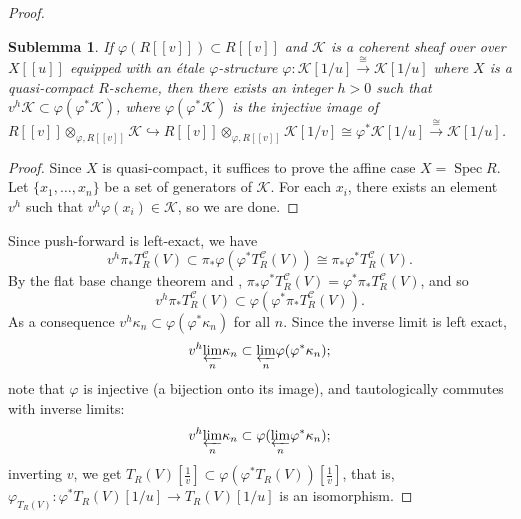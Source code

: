 \documentclass[11pt]{amsart}
\newtheorem{sublem}{Sublemma}
\numberwithin{thm}{section}
\numberwithin{lem}{section}
\numberwithin{cor}{section}
\numberwithin{prop}{section}
\numberwithin{exam}{section}
\numberwithin{dfn}{section}
\newcommand{\spec}{\operatorname{Spec}}
\newcommand{\invlim}[1]{{\varprojlim_{#1}}}
\newcommand{\cK}{\mathcal{K}}
\newcommand{\cC}{\mathcal{C}}
\begin{document}
\begin{proof}
\begin{sublem}
If $\varphi(R[\![v]\!])\subset R[\![v]\!]$
and $\cK$ is a coherent sheaf over
over $X[\![u]\!]$
equipped
with an \'etale $\varphi$-structure
$\varphi:\cK[1/u] \xrightarrow{\cong} \cK[1/u]$
where $X$ is a quasi-compact $R$-scheme,
then there exists an integer $h>0$
such that $v^h\cK \subset \varphi(\varphi^*\cK)$,
where $\varphi(\varphi^*\cK)$ is the injective image of
$R[\![v]\!]\otimes_{\varphi,R[\![v]\!]}\cK
\hookrightarrow
R[\![v]\!]\otimes_{\varphi,R[\![v]\!]}\cK[1/v]
\cong \varphi^*\cK[1/u] \xrightarrow{\cong} \cK[1/u]$.
\end{sublem}

\begin{proof}
Since $X$ is quasi-compact, it suffices to prove the
affine case $X=\spec R$.
Let $\{x_1,\dots, x_n\}$ be a set of generators of $\cK$.
For each $x_i$, there exists an element $v^h$ such that
$v^h\varphi(x_i)\in \cK$, so we are done.
\end{proof}

Since push-forward is left-exact, we have
\[
v^h \pi_*T^\cC_R(V) \subset \pi_*\varphi(\varphi^*T^\cC_R(V))
\cong \pi_*\varphi^*T^\cC_R(V).
\]
By the flat base change theorem and \cite[Lemma 5.2.5]{EG21},
$\pi_*\varphi^*T^\cC_R(V)=\varphi^*\pi_*T^\cC_R(V)$,
and so
\[
v^h \pi_*T^\cC_R(V) \subset \varphi(\varphi^*\pi_*T^\cC_R(V)).
\]
As a consequence $v^h \kappa_n\subset \varphi( \varphi^*\kappa_n)$
for all $n$.
Since the inverse limit is left exact,
\[
v^h\invlim{n} \kappa_n\subset \invlim{n} 
\varphi(\varphi^*\kappa_n);\]
note that $\varphi$ is injective (a bijection
onto its image), and tautologically commutes
with inverse limits:
\[
v^h\invlim{n} \kappa_n\subset \varphi(\invlim{n} 
\varphi^*\kappa_n);\]
inverting $v$, we get
$T_R(V)[\frac{1}{v}]\subset 
\varphi(\varphi^*T_R(V))[\frac{1}{v}]$,
that is, $\varphi_{T_R(V)}:
\varphi^*T_R(V)[1/u]\to T_R(V)[1/u]
$ is an isomorphism.


\end{proof}
\end{document}
